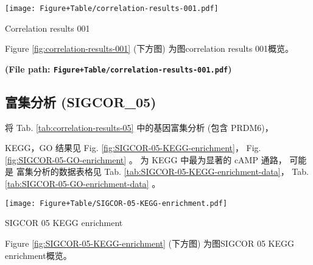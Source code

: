 \documentclass[
]{article}
\begin{document}
\begin{center}\vspace{1.5cm}\end{center}

\begin{center}\vspace{1.5cm}\end{center}
\def\@captype{figure}
\begin{center}
\texttt{[image: Figure+Table/correlation-results-001.pdf]}
\caption{Correlation results 001}\label{fig:correlation-results-001}
\end{center}

Figure \ref{fig:correlation-results-001} (下方图) 为图correlation results 001概览。

\textbf{(File path: \texttt{Figure+Table/correlation-results-001.pdf})}

\begin{center}\vspace{1.5cm}\end{center}

\hypertarget{ux5bccux96c6ux5206ux6790-sigcor_05}{%
\subsection{富集分析 (SIGCOR\_05)}\label{ux5bccux96c6ux5206ux6790-sigcor_05}}

将 Tab. \ref{tab:correlation-results-05} 中的基因富集分析 (包含 PRDM6)，

KEGG，GO 结果见 Fig. \ref{fig:SIGCOR-05-KEGG-enrichment}， Fig. \ref{fig:SIGCOR-05-GO-enrichment} 。
为 KEGG 中最为显著的 cAMP 通路，
可能是
富集分析的数据表格见 Tab. \ref{tab:SIGCOR-05-KEGG-enrichment-data}， Tab. \ref{tab:SIGCOR-05-GO-enrichment-data} 。

\begin{center}\vspace{1.5cm}\end{center}
\def\@captype{figure}
\begin{center}
\texttt{[image: Figure+Table/SIGCOR-05-KEGG-enrichment.pdf]}
\caption{SIGCOR 05 KEGG enrichment}\label{fig:SIGCOR-05-KEGG-enrichment}
\end{center}

Figure \ref{fig:SIGCOR-05-KEGG-enrichment} (下方图) 为图SIGCOR 05 KEGG enrichment概览。
\end{document}
